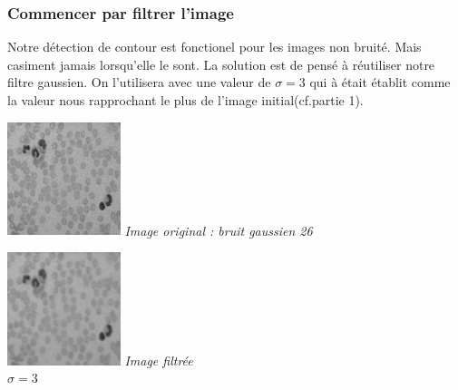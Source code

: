 \documentclass[a4,12pt]{article}
\begin{document}
\subsubsection{Commencer par filtrer l'image}
Notre détection de contour est fonctionel pour les images non bruité.
Mais casiment jamais lorsqu'elle le sont. La solution est de pensé à réutiliser notre filtre gaussien.
On l'utilisera avec une valeur de $\sigma=3$ qui à était établit comme la valeur nous rapprochant le plus de l'image initial(cf.partie 1).\\

\noindent
\begin{center}
\begin{minipage}[c]{0.20\linewidth}
	\begin{center}
		\includegraphics[width = 33mm]{./img/globulesbb26.jpg}
		\textit{Image original : bruit gaussien 26}
	\end{center}
\end{minipage}
\begin{minipage}[c]{0.20\linewidth}
	\begin{center}
		\includegraphics[width = 33mm]{./img/globulesbb26_filtrer3.jpg}
		\textit{Image filtrée \\ $\sigma=3$}
	\end{center}
\end{minipage}
\end{center}
\end{document}
